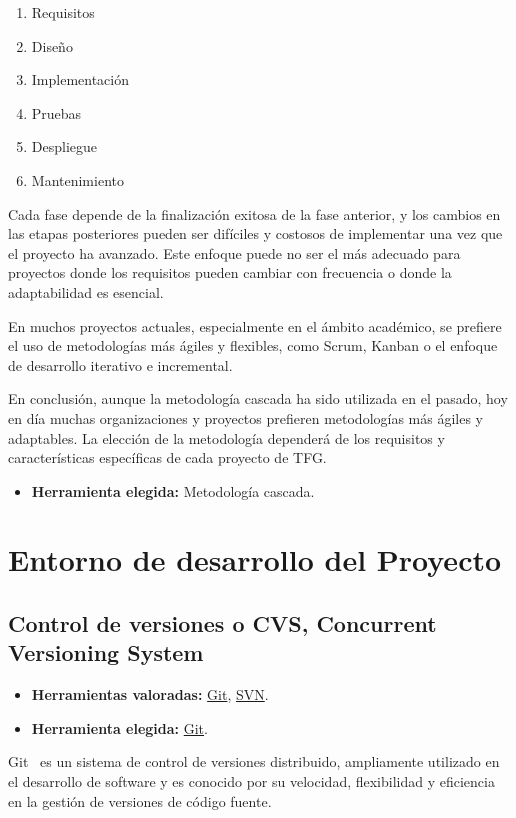 \begin{enumerate}
\item Requisitos
\item Diseño
\item Implementación
\item Pruebas
\item Despliegue
\item Mantenimiento
\end{enumerate}

Cada fase depende de la finalización exitosa de la fase anterior, y los cambios en las etapas posteriores pueden ser difíciles y costosos de implementar una vez que el proyecto ha avanzado. Este enfoque puede no ser el más adecuado para proyectos donde los requisitos pueden cambiar con frecuencia o donde la adaptabilidad es esencial.

En muchos proyectos actuales, especialmente en el ámbito académico, se prefiere el uso de metodologías más ágiles y flexibles, como Scrum, Kanban o el enfoque de desarrollo iterativo e incremental.

En conclusión, aunque la metodología cascada ha sido utilizada en el pasado, hoy en día muchas organizaciones y proyectos prefieren metodologías más ágiles y adaptables. La elección de la metodología dependerá de los requisitos y características específicas de cada proyecto de TFG.

\begin{itemize}
	\item \textbf{Herramienta elegida:} Metodología cascada.
\end{itemize}

\section{Entorno de desarrollo del Proyecto}
\subsection{Control de versiones o CVS, Concurrent Versioning System}\label{4:controlVersiones}
\begin{itemize}
    \item \textbf{Herramientas valoradas:} \href{https://git-scm.com/}{Git}, \href{https://subversion.apache.org/}{SVN}.
    \item \textbf{Herramienta elegida:} \href{https://git-scm.com/}{Git}.
\end{itemize}
Git~\cite{misc:Git} es un sistema de control de versiones distribuido, ampliamente utilizado en el desarrollo de software y es conocido por su velocidad, flexibilidad y eficiencia en la gestión de versiones de código fuente.

